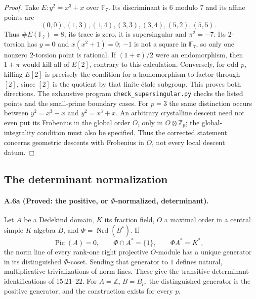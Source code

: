 \begin{proof}
Take $E:y^2=x^3+x$ over $\mathbb F_7$. Its discriminant is $6$ modulo
$7$ and its affine points are
\[
 (0,0),(1,3),(1,4),(3,3),(3,4),(5,2),(5,5).
\]
Thus $\#E(\mathbb F_7)=8$, its trace is zero, it is supersingular and
$\pi^2=-7$. Its $2$-torsion has $y=0$ and
$x(x^2+1)=0$; $-1$ is not a square in $\mathbb F_7$, so only one
nonzero $2$-torsion point is rational. If $(1+\pi)/2$ were an
endomorphism, then $1+\pi$ would kill all of $E[2]$, contrary to this
calculation. Conversely, for odd $p$, killing $E[2]$ is precisely the
condition for a homomorphism to factor through $[2]$, since $[2]$ is
the quotient by that finite étale subgroup. This proves both directions.
The exhaustive program \texttt{check\_supersingular.py} checks the
listed points and the small-prime boundary cases. For $p=3$ the same
distinction occurs between $y^2=x^3-x$ and $y^2=x^3+x$.
An arbitrary crystalline descent need not even put its Frobenius in
the global order $O$, only in $O\otimes\mathbb Z_p$; the global-integrality
condition must also be specified. Thus the corrected statement concerns
geometric descents with Frobenius in $O$, not every local descent datum.
\end{proof}

\subsection{The determinant normalization}

\paragraph{A.6a (Proved: the positive, or $\Phi$-normalized, determinant).}
Let $A$ be a Dedekind domain, $K$ its fraction field, $O$ a maximal
order in a central simple $K$-algebra $B$, and $\Phi=\operatorname{Nrd}(B^*)$.
If
\[
 \operatorname{Pic}(A)=0,\qquad \Phi\cap A^*=\{1\},
 \qquad \Phi A^*=K^*,
\]
the norm line of every rank-one right projective $O$-module has a
unique generator in its distinguished $\Phi$-coset. Sending that
generator to $1$ defines natural, multiplicative trivializations of
norm lines. These give the transitive determinant identifications of
15:21--22. For $A=\mathbb Z$, $B=B_p$, the distinguished generator
is the positive generator, and the construction exists for every $p$.

